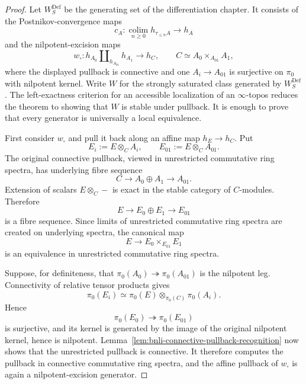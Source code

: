 \begin{proof}
Let $W_S^{\mathrm{Def}}$ be the generating set of the differentiation chapter.
It consists of the Postnikov-convergence maps
\[
    c_A:
    \operatorname*{colim}_{n\geq0}h_{\tau_{\leq n}A}
    \longrightarrow h_A
\]
and the nilpotent-excision maps
\[
    w_\square:
    h_{A_0}\amalg_{h_{A_{01}}}h_{A_1}
    \longrightarrow h_C,
    \qquad
    C\simeq A_0\times_{A_{01}}A_1,
\]
where the displayed pullback is connective and one
$A_i\to A_{01}$ is surjective on $\pi_0$ with nilpotent kernel.  Write $W$
for the strongly saturated class generated by $W_S^{\mathrm{Def}}$.  The
left-exactness criterion for an accessible localization of an $\infty$-topos
reduces the theorem to showing that $W$ is stable under pullback.  It is enough
to prove that every generator is universally a local equivalence.

First consider $w_\square$ and pull it back along an affine map
$h_E\to h_C$.  Put
\[
    E_i:=E\otimes_CA_i,
    \qquad
    E_{01}:=E\otimes_CA_{01}.
\]
The original connective pullback, viewed in unrestricted commutative ring
spectra, has underlying fibre sequence
\[
    C\longrightarrow A_0\oplus A_1\longrightarrow A_{01}.
\]
Extension of scalars $E\otimes_C-$ is exact in the stable category of
$C$-modules.  Therefore
\[
    E\longrightarrow E_0\oplus E_1\longrightarrow E_{01}
\]
is a fibre sequence.  Since limits of unrestricted commutative ring spectra
are created on underlying spectra, the canonical map
\[
    E\longrightarrow E_0\times_{E_{01}}E_1
\]
is an equivalence in unrestricted commutative ring spectra.

Suppose, for definiteness, that
$\pi_0(A_0)\twoheadrightarrow\pi_0(A_{01})$ is the nilpotent leg.  Connectivity
of relative tensor products gives
\[
    \pi_0(E_i)
    \simeq
    \pi_0(E)\otimes_{\pi_0(C)}\pi_0(A_i).
\]
Hence
\[
    \pi_0(E_0)\twoheadrightarrow\pi_0(E_{01})
\]
is surjective, and its kernel is generated by the image of the original
nilpotent kernel, hence is nilpotent.  Lemma~\ref{lem:bnli-connective-pullback-recognition}
now shows that the unrestricted pullback is connective.  It therefore computes
the pullback in connective commutative ring spectra, and the affine pullback
of $w_\square$ is again a nilpotent-excision generator.


\end{proof}
